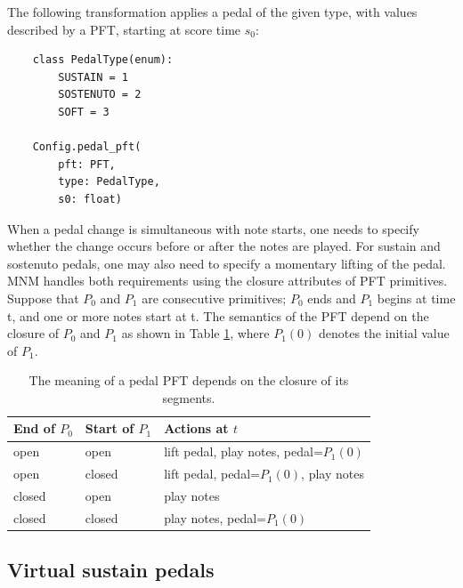 \documentclass[letterpaper, 12pt]{article}
\begin{document}
The following transformation applies a pedal of the given type,
with values described by a PFT, starting at score time $ s_0 $:
\begin{small}\begin{singlespace}\vspace{-18px}\begin{verbatim}
    class PedalType(enum):
        SUSTAIN = 1
        SOSTENUTO = 2
        SOFT = 3

    Config.pedal_pft(
        pft: PFT,
        type: PedalType,
        s0: float)
\end{verbatim}\end{singlespace}\end{small}\vspace{-18px}\noindent

When a pedal change is simultaneous with note starts,
one needs to specify
whether the change occurs before or after the notes are played.
For sustain and sostenuto pedals,
one may also need to specify a momentary lifting of the pedal.
MNM handles both requirements using the closure attributes
of PFT primitives.
Suppose that $P_0$ and $P_1$ are consecutive primitives;
$P_0$ ends and $P_1$ begins at time t,
and one or more notes start at t.
The semantics of the PFT depend on the closure of $P_0$ and $P_1$ as
shown in Table \ref{table:pedal},
where $P_1 (0)$ denotes the initial value of $P_1$.

\begin{table}
\begin{tabular}{l l l}
End of $P_0$ &  Start of $P_1$  &   Actions at $t$ \\
\hline
open    &    open     &       lift pedal, play notes, pedal=$P_1 (0)$ \\
open    &    closed   &       lift pedal, pedal=$P_1 (0)$, play notes \\
closed  &    open     &       play notes \\
closed  &    closed   &       play notes, pedal=$P_1 (0)$ \\

\end{tabular}
\caption{The meaning of a pedal PFT depends on the closure of its segments.}
\label{table:pedal}
\end{table}

\subsection{Virtual sustain pedals}
\end{document}
